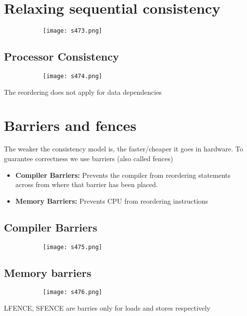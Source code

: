 \documentclass[8pt]{extreport}
\begin{document}
\section{Relaxing sequential consistency}

 \begin{figure}[H]
\begin{subfigure}[b]{0.4\linewidth}
\texttt{[image: s473.png]}
\end{subfigure}
\end{figure}

\subsection{Processor Consistency}

 \begin{figure}[H]
\begin{subfigure}[b]{0.4\linewidth}
\texttt{[image: s474.png]}
\end{subfigure}
\end{figure}
The reordering does not apply for data dependencies



\section{Barriers and fences}
The weaker the consistency model is, the faster/cheaper it goes in hardware. To guarantee correctness we use barriers (also called fences)
\begin{itemize}
\item \textbf{Compiler Barriers:} Prevents the compiler from reordering statements across from where that barrier has been placed.
\item \textbf{Memory Barriers:} Prevents CPU from reordering instructions
\end{itemize}


\subsection{Compiler Barriers}
 \begin{figure}[H]
\begin{subfigure}[b]{0.4\linewidth}
\texttt{[image: s475.png]}
\end{subfigure}
\end{figure}

\subsection{Memory barriers}
 \begin{figure}[H]
\begin{subfigure}[b]{0.4\linewidth}
\texttt{[image: s476.png]}
\end{subfigure}
\end{figure}
LFENCE, SFENCE are barries only for loads and stores respectively
\end{document}
